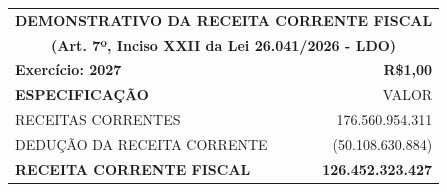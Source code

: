 \documentclass{article}
\begin{document}
\pagestyle{empty}

\renewcommand*{\arraystretch}{1.9}\footnotesize\color{myblack}\centering\noindent\begin{longtable}[c]{m{15cm}m{5cm}}\multicolumn{2}{c}{\cellcolor{gray!50} \textcolor{myblack} {\small \textbf{DEMONSTRATIVO DA RECEITA CORRENTE FISCAL}}} \\\multicolumn{2}{c}{\cellcolor{gray!50} \textcolor{myblack} {\footnotesize \textbf{(Art. 7º, Inciso XXII da Lei 26.041/2026 - LDO)}}}  \\\multicolumn{1}{l}{\textbf{Exercício: 2027 }} & \multicolumn{1}{r}{\textbf{R\$1,00}} \\\hline\hline\multicolumn{1}{l}{\textbf{ ESPECIFICAÇÃO}} & \multicolumn{1}{r}{VALOR} \\\hline\hline\multicolumn{1}{L{15cm}}{ RECEITAS CORRENTES } & \multicolumn{1}{r}{ 176.560.954.311 } \\
\multicolumn{1}{L{15cm}}{ DEDUÇÃO DA RECEITA CORRENTE } & \multicolumn{1}{r}{ (50.108.630.884) } \\
\hline\hline\hline
\multicolumn{1}{L{15cm}}{ \textbf{ RECEITA CORRENTE FISCAL }} & \multicolumn{1}{r}{ \textbf{ 126.452.323.427 }} \\
\hline\hline\hline\end{longtable}\raggedright\fontsize{7pt}{10pt}\selectfont {Fonte: PPO.}\\\fontsize{7pt}{10pt}\selectfont {ELABORAÇÃO: DCAF/SCPPO/SEPLAG}\\
\end{document}
